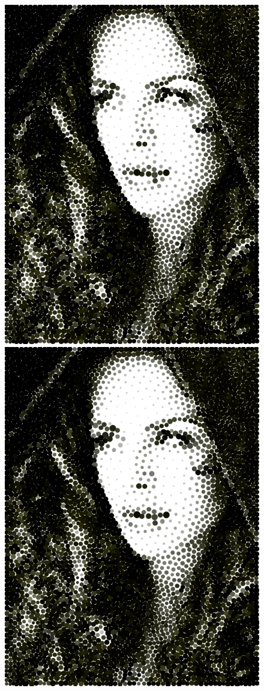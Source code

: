 \documentclass[11pt]{article}
\begin{document}
\begin{figure}[H]
\includegraphics[scale=0.4]{fairyeyes-4k-color-2.png}
\includegraphics[scale=0.4]{fairyeyes-4k-color-3.png}

\end{figure}
\end{document}
